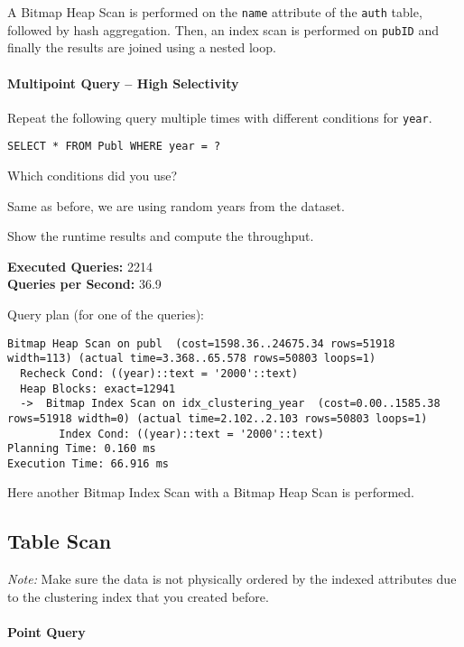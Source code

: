 \documentclass[11pt]{scrartcl}
\begin{document}
A Bitmap Heap Scan is performed on the \texttt{name} attribute of the \texttt{auth} table, followed by hash aggregation.
Then, an index scan is performed on \texttt{pubID} and finally the results are joined using a nested loop.

\paragraph{Multipoint Query -- High Selectivity}

Repeat the following query multiple times with different conditions for \texttt{year}.

\begin{lstlisting}[style=dbtsql]
SELECT * FROM Publ WHERE year = ?
\end{lstlisting}

Which conditions did you use?

Same as before, we are using random years from the dataset.

Show the runtime results and compute the throughput.

\textbf{Executed Queries: } 2214\\
\textbf{Queries per Second: } 36.9

Query plan (for one of the queries):

{\small
\parskip0pt\begin{verbatim}
Bitmap Heap Scan on publ  (cost=1598.36..24675.34 rows=51918 width=113) (actual time=3.368..65.578 rows=50803 loops=1)
  Recheck Cond: ((year)::text = '2000'::text)
  Heap Blocks: exact=12941
  ->  Bitmap Index Scan on idx_clustering_year  (cost=0.00..1585.38 rows=51918 width=0) (actual time=2.102..2.103 rows=50803 loops=1)
        Index Cond: ((year)::text = '2000'::text)
Planning Time: 0.160 ms
Execution Time: 66.916 ms
\end{verbatim}}

Here another Bitmap Index Scan with a Bitmap Heap Scan is performed.

\subsection*{Table Scan}

\emph{Note:} Make sure the data is not physically ordered by the indexed attributes due to the clustering index that you created before.

\paragraph{Point Query}
\end{document}
